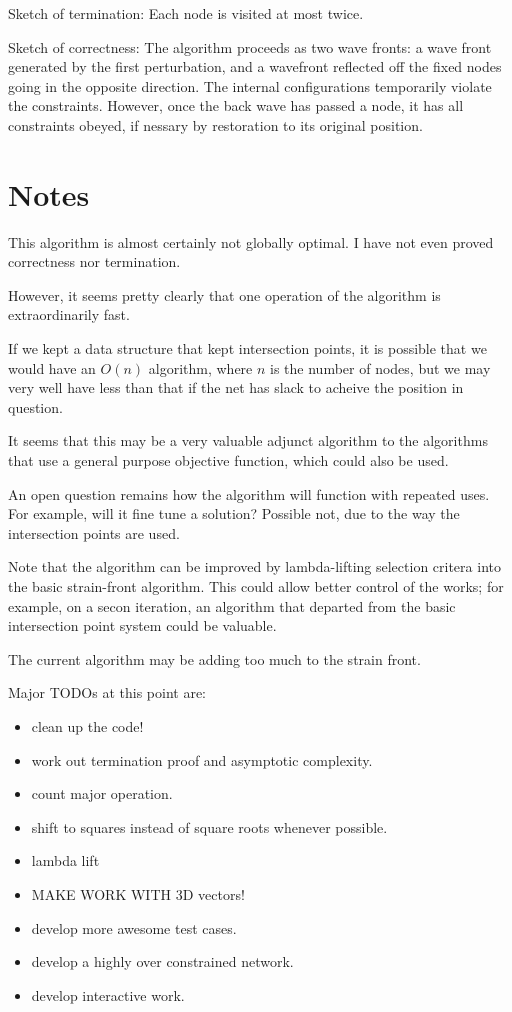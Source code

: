 \documentclass[11pt]{article}
\begin{document}
Sketch of termination:
Each node is visited at most twice.

Sketch of correctness:
The algorithm proceeds as two wave fronts: a wave front generated by the first perturbation,
and a wavefront reflected off the fixed nodes going in the opposite direction. The
internal configurations temporarily violate the constraints.  However, once the back
wave has passed a node, it has all constraints obeyed, if nessary by restoration to its
original position.

\section{Notes}

This algorithm is almost certainly not globally optimal.  I have not even proved correctness
nor termination.

However, it seems pretty clearly that one operation of the algorithm is extraordinarily fast.

If we kept a data structure that kept intersection points, it is possible that we would
have an $O(n)$ algorithm, where $n$ is the number of nodes, but we may very well have
less than that if the net has slack to acheive the position in question.

It seems that this may be a very valuable adjunct algorithm to the algorithms that
use a general purpose objective function, which could also be used.

An open question remains how the algorithm will function with repeated uses.
For example, will it fine tune a solution?  Possible not, due to the way the
intersection points are used.

Note that the algorithm can be improved by lambda-lifting selection critera into
the basic strain-front algorithm. This could allow better control of the  works;
for example, on a secon iteration, an algorithm that departed from the basic
intersection point system could be valuable.

The current algorithm may be adding too much to the strain front.

Major TODOs at this point are:
\begin{itemize}
\item clean up the code!
\item work out termination proof and asymptotic complexity.
\item count major operation.
\item shift to squares instead of square roots whenever possible.
\item lambda lift
\item MAKE WORK WITH 3D vectors!
\item develop more awesome test cases.
  \item develop a highly over constrained network.
  \item develop interactive work.
  \end{itemize}
\end{document}
